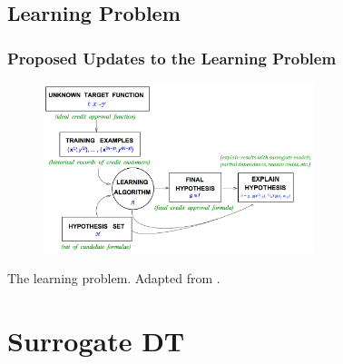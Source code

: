 \documentclass[11pt,
               aspectratio=169
               ]{beamer}
\begin{document}
    \subsection{Learning Problem}
	
		\begin{frame}
		
			\frametitle{Proposed Updates to the Learning Problem}
			
			\begin{figure}[htb]
				\begin{center}
					\includegraphics[height=140pt]{img/learning_problem.png}
					\label{fig:learning_problem}
				\end{center}
			\end{figure}
			
			The learning problem. Adapted from \cite{lfd}.
			
		\end{frame}

	\section{Surrogate DT}
\end{document}
